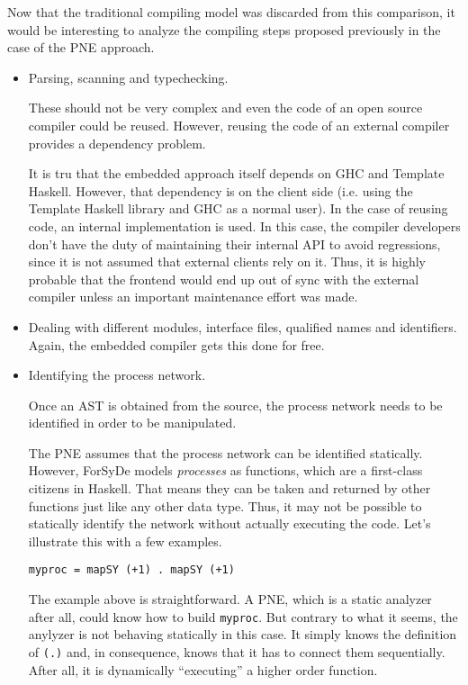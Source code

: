 \documentclass[a4paper,twoside,11pt]{article}
\begin{document}
Now that the traditional compiling model was discarded from this comparison,
it would be interesting to analyze the compiling steps proposed previously in
the case of the PNE approach.


\begin{itemize}

\item Parsing, scanning and typechecking.

  These should not be very complex and even the code of an open source
  compiler could be reused. However, reusing the code of an external compiler
  provides a dependency problem.
      
  It is tru that the embedded approach itself depends on GHC and Template
  Haskell. However, that dependency is on the client side (i.e. using the
  Template Haskell library and GHC as a normal user). In the case of reusing
  code, an internal implementation is used. In this case, the compiler
  developers don't have the duty of maintaining their internal API to avoid
  regressions, since it is not assumed that external clients rely on it.
  Thus, it is highly probable that the frontend would end up out of sync with
  the external compiler unless an important maintenance effort was made.
  

\item Dealing with different modules, interface files, qualified names
  and identifiers. Again, the embedded compiler gets this done for free.

\item Identifying the process network.

  Once an AST is obtained from the source, the process network
  needs to be identified in order to be manipulated.

  The PNE assumes that the process network can be identified
  statically. However, ForSyDe models \textit{processes} as functions, which
  are a first-class citizens in Haskell. That means they can be taken and
  returned by other functions just like any other data type. Thus, it may not
  be possible to statically identify the network without actually executing
  the code. Let's illustrate this with a few examples.
\begin{verbatim}
myproc = mapSY (+1) . mapSY (+1)
\end{verbatim}

  The example above is straightforward. A PNE, which is a static analyzer
  after all, could know how to build \texttt{myproc}. But contrary to what it
  seems, the anylyzer is not behaving statically in this case. It simply knows
  the definition of \texttt{(.)} and, in consequence, knows that it has to
  connect them sequentially. After all, it is dynamically ``executing'' a
  higher order function.


\end{itemize}
\end{document}
